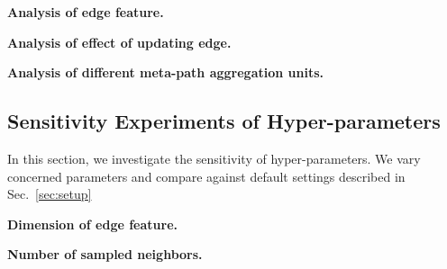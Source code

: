 \textbf{Analysis of edge feature.}

\textbf{Analysis of effect of updating edge.}

\textbf{Analysis of different meta-path aggregation units.}

\subsection{Sensitivity Experiments of Hyper-parameters}
In this section, we investigate the sensitivity of hyper-parameters. We vary concerned parameters and compare against default settings described in Sec.~\ref{sec:setup} 

\textbf{Dimension of edge feature.}

\textbf{Number of sampled neighbors.}






